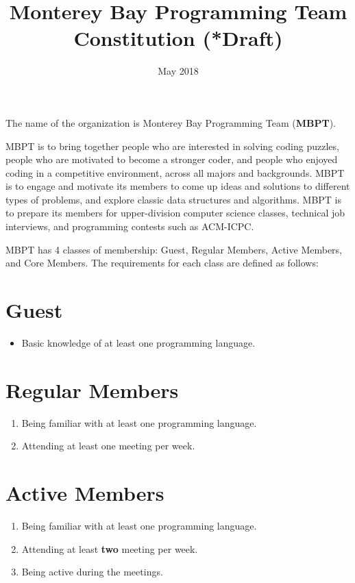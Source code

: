 \documentclass[20pt]{constitution}
\begin{document}
\title{Monterey Bay Programming Team Constitution (*Draft)}
\date{May 2018}
\maketitle
\setcounter{tocdepth}{0}
\tableofcontents
\newpage

The name of the organization is Monterey Bay Programming Team ({\bf MBPT}).

MBPT is to bring together people who are interested in solving coding puzzles,
people who are motivated to become a stronger coder, 
and people who enjoyed coding in a competitive environment, 
across all majors and backgrounds.
MBPT is to engage and motivate its members to come up ideas and solutions to 
different types of problems, and explore classic data structures and algorithms.
MBPT is to prepare its members for upper-division computer science classes, 
technical job interviews, and programming contests such as ACM-ICPC.

MBPT has 4 classes of membership: Guest, Regular Members, Active Members, and Core Members.
The requirements for each class are defined as follows:
\section{Guest}
\begin{itemize}
    \item Basic knowledge of at least one programming language.
\end{itemize}
\section{Regular Members}
\begin{enumerate}
    \item Being familiar with at least one programming language.
    \item Attending at least one meeting per week.
\end{enumerate}
\section{Active Members}
\begin{enumerate} 
    \item Being familiar with at least one programming language.
    \item Attending at least {\bf two} meeting per week.
    \item Being active during the meetings.
\end{enumerate}
\end{document}
